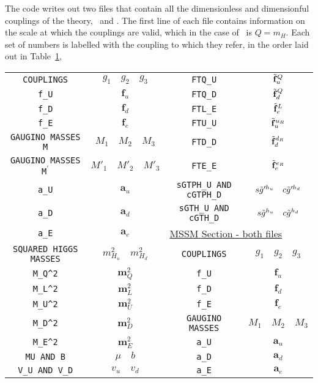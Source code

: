 The code writes out two files that contain all the dimensionless and
dimensionful couplings of the theory, \wout~and \gout. The first line of
each file contains information on the scale at which the couplings are
valid, which in the case of \wout~is $Q=m_H$. Each set of numbers is
labelled with the coupling to which they refer, in the order laid out in
Table~\ref{tab:output}, %
\begin{table}\label{tab:output}
\centering
\begin{tabular}{cc||cc} {\texttt{COUPLINGS}}&$g_1\quad g_2\quad
g_3$&{\texttt{FTQ\_U}}&$\tilde{\mathbf{f}}^Q_u$\\[1pt]
{\texttt{f\_U}}&${\mathbf{f}}_u$&{\texttt{FTQ\_D}}&$\tilde{\mathbf{f}}^Q_d$\\[1pt]
{\texttt{f\_D}}&${\mathbf{f}}_d$&{\texttt{FTL\_E}}&$\tilde{\mathbf{f}}^L_e$\\[1pt]
{\texttt{f\_E}}&${\mathbf{f}}_e$&{\texttt{FTU\_U}}&$\tilde{\mathbf{f}}^{u_R}_u$\\[1pt]
{\texttt{GAUGINO MASSES M}}&$M_1\quad M_2\quad
M_3$&{\texttt{FTD\_D}}&$\tilde{\mathbf{f}}^{d_R}_d$\\[1pt] {\texttt{GAUGINO MASSES
M$^\prime$}}&$M'_1\quad M'_2\quad
M'_3$&{\texttt{FTE\_E}}&$\tilde{\mathbf{f}}^{e_R}_e$\\[1pt]
{\texttt{a\_U}}&${\mathbf{a}}_u$&{\texttt{sGTPH\_U AND
cGTPH\_D}}&$s\tilde{g}'^{h_u}\quad c\tilde{g}'^{h_d}$\\[1pt]
{\texttt{a\_D}}&${\mathbf{a}}_d$&{\texttt{sGTH\_U AND
cGTH\_D}}&$s\tilde{g}^{h_u}\quad c\tilde{g}^{h_d}$\\[1pt] \cline{3-4}
{\texttt{a\_E}}&${\mathbf{a}}_e$&\multicolumn{2}{l}{\underline{MSSM
Section - both files}}\\[1pt] {\texttt{SQUARED HIGGS
MASSES}}&$m^2_{H_u}\quad m^2_{H_d}$&{\texttt{COUPLINGS}}&$g_1\quad
g_2\quad g_3$\\[1pt]
{\texttt{M\_Q\^{}2}}&${\mathbf{m}}^2_Q$&{\texttt{f\_U}}&${\mathbf{f}}_u$\\[1pt]
{\texttt{M\_L\^{}2}}&${\mathbf{m}}^2_L$&{\texttt{f\_D}}&${\mathbf{f}}_d$\\[1pt]
{\texttt{M\_U\^{}2}}&${\mathbf{m}}^2_U$&{\texttt{f\_E}}&${\mathbf{f}}_e$\\[1pt]
{\texttt{M\_D\^{}2}}&${\mathbf{m}}^2_D$&{\texttt{GAUGINO
MASSES}}&$M_1\quad M_2\quad M_3$\\[1pt]
{\texttt{M\_E\^{}2}}&${\mathbf{m}}^2_E$&{\texttt{a\_U}}&${\mathbf{a}}_u$\\[1pt]
{\texttt{MU AND B}}&$\mu\quad b$&{\texttt{a\_D}}&${\mathbf{a}}_d$\\[1pt]
{\texttt{V\_U AND V\_D}}&$v_u\quad
v_d$&{\texttt{a\_E}}&${\mathbf{a}}_e$\\[1pt]

\end{tabular}
\end{table}
